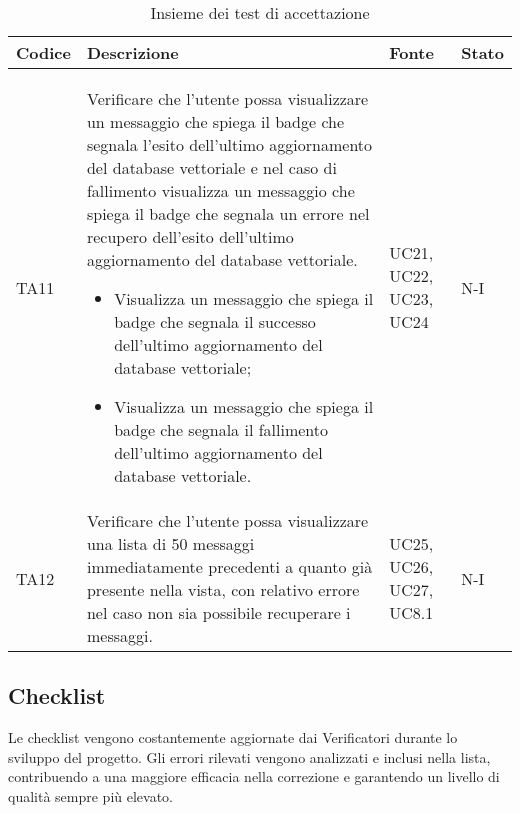\newpage

\begin{table}[h!]
    \centering
    \renewcommand{\arraystretch}{1.5} %
    \begin{tabularx}{\textwidth}{|p{}|X|p{}|p{}|}\hline
    \rowcolor[HTML]{FFD700}
    \textbf{Codice} & \textbf{Descrizione} & \textbf{Fonte} & \textbf{Stato} \\ \hline
    TA11 & Verificare che l'utente possa visualizzare un messaggio che spiega il badge che segnala l'esito dell'ultimo aggiornamento del database vettoriale e nel caso di fallimento visualizza un messaggio che spiega il badge che segnala un errore nel recupero dell'esito dell'ultimo aggiornamento del database vettoriale.
    \begin{itemize}
        \item Visualizza un messaggio che spiega il badge che segnala il successo dell'ultimo aggiornamento del database vettoriale;
        \item Visualizza un messaggio che spiega il badge che segnala il fallimento dell'ultimo aggiornamento del database vettoriale.
    \end{itemize} 
    & UC21, UC22, UC23, UC24 & N-I \\ \hline
    TA12 & Verificare che l'utente possa visualizzare una lista di 50 messaggi immediatamente precedenti a quanto già presente nella vista, con relativo errore nel caso non sia possibile recuperare i messaggi. & UC25, UC26, UC27, UC8.1 & N-I \\ \hline

    \end{tabularx}
    \caption{Insieme dei test di accettazione}
\end{table}

\newpage

\subsection{Checklist}
\label{sec:checklist}
Le checklist vengono costantemente aggiornate dai Verificatori durante lo sviluppo del progetto. Gli errori rilevati vengono analizzati e inclusi nella lista, contribuendo a una maggiore efficacia nella correzione e garantendo un livello di qualità sempre più elevato.

